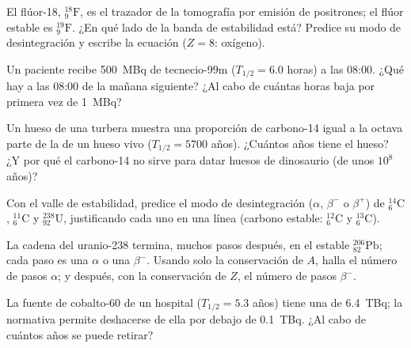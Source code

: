 \begin{exercise}[$\star\star$]\label{exo:g11:nucleus-radioactivity:8}
El flúor-18, ${}^{18}_{9}\mathrm{F}$, es el trazador de la tomografía
por emisión de positrones; el flúor estable es
${}^{19}_{9}\mathrm{F}$. ¿En qué lado de la banda de estabilidad está?
Predice su modo de desintegración y escribe la ecuación ($Z = 8$:
oxígeno).
\end{exercise}

\begin{exercise}[$\star\star$]\label{exo:g11:nucleus-radioactivity:9}
Un paciente recibe \qty{500}{MBq} de tecnecio-99m
($T_{1/2} = 6.0$ horas) a las 08:00. ¿Qué  hay a las 08:00 de
la mañana siguiente? ¿Al cabo de cuántas horas baja por primera vez de
\qty{1}{MBq}?
\end{exercise}

\begin{exercise}[$\star\star$]\label{exo:g11:nucleus-radioactivity:10}
Un hueso de una turbera muestra una proporción de carbono-14 igual a la
octava parte de la de un hueso vivo ($T_{1/2} = \num{5700}$ años).
¿Cuántos años tiene el hueso? ¿Y por qué el carbono-14 no sirve para
datar huesos de dinosaurio (de unos $10^{8}$ años)?
\end{exercise}

\begin{exercise}[$\star\star$]\label{exo:g11:nucleus-radioactivity:11}
Con el valle de estabilidad, predice el modo de desintegración
($\alpha$, $\beta^-$ o $\beta^+$) de ${}^{14}_{6}\mathrm{C}$,
${}^{11}_{6}\mathrm{C}$ y ${}^{238}_{92}\mathrm{U}$, justificando cada
uno en una línea (carbono estable: ${}^{12}_{6}\mathrm{C}$ y
${}^{13}_{6}\mathrm{C}$).
\end{exercise}

\begin{exercise}[$\star\star\star$]\label{exo:g11:nucleus-radioactivity:12}
La cadena del uranio-238 termina, muchos pasos después, en el estable
${}^{206}_{82}\mathrm{Pb}$; cada paso es una $\alpha$ o una $\beta^-$.
Usando solo la conservación de $A$, halla el número de pasos $\alpha$; y
después, con la conservación de $Z$, el número de pasos $\beta^-$.
\end{exercise}

\begin{exercise}[$\star\star\star$]\label{exo:g11:nucleus-radioactivity:13}
La fuente de cobalto-60 de un hospital ($T_{1/2} = 5.3$ años) tiene una
 de \qty{6.4}{TBq}; la normativa permite deshacerse de ella por
debajo de \qty{0.1}{TBq}. ¿Al cabo de cuántos años se puede retirar?
\end{exercise}

